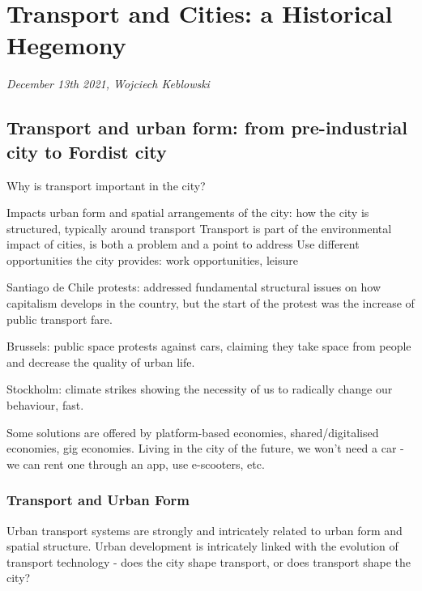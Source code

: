 \documentclass{article}
\begin{document}
\begin{outline}
	\1
\end{outline}



\section{Transport and Cities: a Historical Hegemony}
\textit{December 13th 2021, Wojciech Keblowski}

\subsection{Transport and urban form: from pre-industrial city to Fordist city}

Why is transport important in the city? 

\begin{outline}
	\1 Impacts urban form and spatial arrangements of the city: how the city is structured, typically around transport
	\1 Transport is part of the environmental impact of cities, is both a problem and a point to address
	\1 Use different opportunities the city provides: work opportunities, leisure
\end{outline}

Santiago de Chile protests: addressed fundamental structural issues on how capitalism develops in the country, but the start of the protest was the increase of public transport fare.

Brussels: public space protests against cars, claiming they take space from people and decrease the quality of urban life.

Stockholm: climate strikes showing the necessity of us to radically change our behaviour, fast.

Some solutions are offered by platform-based economies, shared/digitalised economies, gig economies. Living in the city of the future, we won't need a car - we can rent one through an app, use e-scooters, etc.

\subsubsection{Transport and Urban Form}

Urban transport systems are strongly and intricately related to urban form and spatial structure. Urban development is intricately linked with the evolution of transport technology - does the city shape transport, or does transport shape the city?
\end{document}

